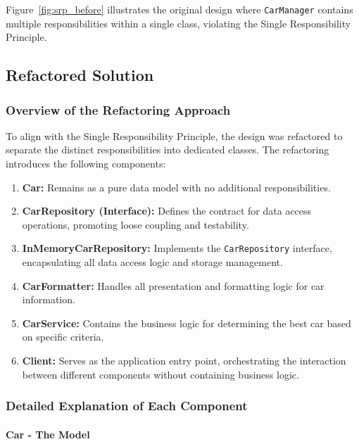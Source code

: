 Figure~\ref{fig:srp_before} illustrates the original design where \texttt{CarManager} contains multiple responsibilities within a single class, violating the Single Responsibility Principle.

\subsection{Refactored Solution}

\subsubsection{Overview of the Refactoring Approach}

To align with the Single Responsibility Principle, the design was refactored to separate the distinct responsibilities into dedicated classes. The refactoring introduces the following components:

\begin{enumerate}
    \item \textbf{Car:} Remains as a pure data model with no additional responsibilities.
    
    \item \textbf{CarRepository (Interface):} Defines the contract for data access operations, promoting loose coupling and testability.
    
    \item \textbf{InMemoryCarRepository:} Implements the \texttt{CarRepository} interface, encapsulating all data access logic and storage management.
    
    \item \textbf{CarFormatter:} Handles all presentation and formatting logic for car information.
    
    \item \textbf{CarService:} Contains the business logic for determining the best car based on specific criteria.
    
    \item \textbf{Client:} Serves as the application entry point, orchestrating the interaction between different components without containing business logic.
\end{enumerate}

\subsubsection{Detailed Explanation of Each Component}

\paragraph{Car - The Model}

